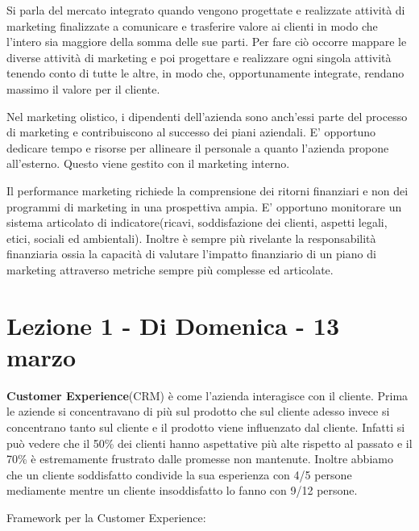 \documentclass[11pt]{article}
\begin{document}
Si parla del mercato integrato quando vengono progettate e realizzate attività di marketing finalizzate a comunicare e trasferire valore ai clienti in modo che l'intero sia maggiore della somma delle sue parti. 
Per fare ciò occorre mappare le diverse attività di marketing e poi progettare e realizzare ogni singola attività tenendo conto di tutte le altre, in modo che, opportunamente integrate, rendano massimo il valore per il cliente.

Nel marketing olistico, i dipendenti dell'azienda sono anch'essi parte del processo di marketing e contribuiscono al successo dei piani aziendali. 
E' opportuno dedicare tempo e risorse per allineare il personale a quanto l'azienda propone all'esterno. Questo viene gestito con il marketing interno.

Il performance marketing richiede la comprensione dei ritorni finanziari e non dei programmi di marketing in una prospettiva ampia. 
E' opportuno monitorare un sistema articolato di indicatore(ricavi, soddisfazione dei clienti, aspetti legali, etici, sociali ed ambientali). 
Inoltre è sempre più rivelante la responsabilità finanziaria ossia la capacità di valutare l'impatto finanziario di un piano di marketing attraverso metriche sempre più complesse ed articolate.

\section{Lezione 1 - Di Domenica - 13 marzo} 
\textbf{Customer Experience}(CRM) è come l'azienda interagisce con il cliente. Prima le aziende si concentravano di più sul prodotto che sul cliente adesso invece si concentrano tanto sul cliente e il prodotto viene influenzato dal cliente. Infatti si può vedere che il 50\% dei clienti hanno aspettative più alte rispetto al passato e il 70\% è estremamente frustrato dalle promesse non mantenute. Inoltre abbiamo che un cliente soddisfatto condivide la sua esperienza con 4/5 persone mediamente mentre un cliente insoddisfatto lo fanno con 9/12 persone.

Framework per la Customer Experience:
\end{document}
